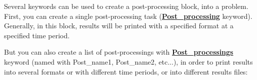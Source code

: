 Several keywords can be used to create a post-processing block, into a problem. First, you can create a single post-processing task (\href{\REFERENCEMANUAL\#postraitement}{\textbf{Post\_processing}} keyword). Generally, in this block, results will be printed with a specified format at a specified time period.
\begin{center}
\end{center}

But you can also create a list of post-processings with \href{\REFERENCEMANUAL\#postraitements}{\textbf{Post\_processings}} keyword (named with Post\_name1, Post\_name2, etc...), in order to print results into several formats or with different time periods, or into different results files:
\begin{center}
\end{center}



